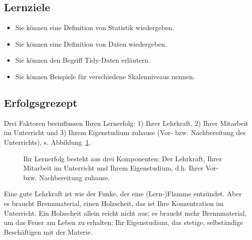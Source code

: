 \documentclass[
  letterpaper,
  twoside,
  open=any]{scrbook}
\providecommand{\tightlist}{%
  \setlength{\itemsep}{0pt}\setlength{\parskip}{0pt}}\usepackage{longtable,booktabs,array}
\theoremstyle{definition}
\theoremstyle{definition}
\theoremstyle{definition}
\theoremstyle{remark}
\begin{document}
\subsection{Lernziele}\label{lernziele-1}

\begin{itemize}
\tightlist
\item
  Sie können eine Definition von Statistik wiedergeben.
\item
  Sie können eine Definition von Daten wiedergeben.
\item
  Sie können den Begriff Tidy-Daten erläutern.
\item
  Sie können Beispiele für verschiedene Skalenniveaus nennen.
\end{itemize}

\subsection{Erfolgsgrezept}\label{erfolgsgrezept}

Drei Faktoren beeinflussen Ihren Lernerfolg: 1) Ihrer Lehrkraft, 2)
Ihrer Mitarbeit im Unterricht und 3) Ihrem Eigenstudium zuhause (Vor-
bzw. Nachbereitung des Unterrichts), s.
Abbildung~\ref{fig-erfolgsrezept}.

\begin{figure}


\caption{\label{fig-erfolgsrezept}Ihr Lernerfolg besteht aus drei
Komponenten: Der Lehrkraft, Ihrer Mitarbeit im Unterricht und Ihrem
Eigenstudium, d.h. Ihrer Vor- bzw. Nachbereitung zuhause.}

\end{figure}%

Eine gute Lehrkraft ist wie der Funke, der eine (Lern-)Flamme entzündet.
Aber es braucht Brennmaterial, einen Holzscheit, das ist Ihre
Konzentration im Unterricht. Ein Holzscheit allein reicht nicht aus; es
braucht mehr Brennmaterial, um das Feuer am Leben zu erhalten: Ihr
Eigenstudium, das stetige, selbständige Beschäftigen mit der Materie.
\end{document}
